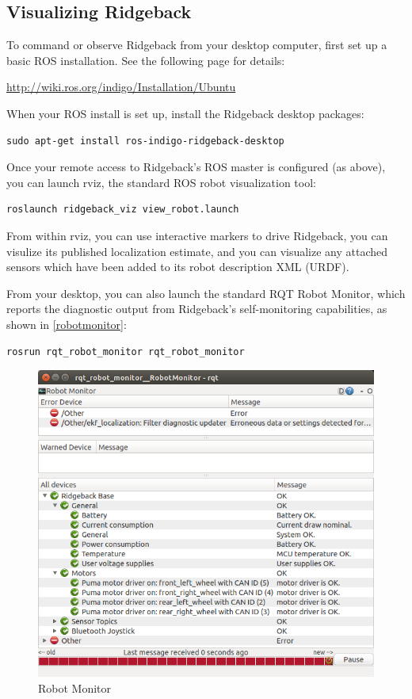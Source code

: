 \documentclass[]{clearpath-latex/clearpath-manual}
\begin{document}
\subsection{Visualizing Ridgeback}

To command or observe Ridgeback from your desktop computer, first set up a basic ROS installation.  See the following page for details:

\url{http://wiki.ros.org/indigo/Installation/Ubuntu}

When your ROS install is set up, install the Ridgeback desktop packages:

\begin{lstlisting}
sudo apt-get install ros-indigo-ridgeback-desktop
\end{lstlisting}

Once your remote access to Ridgeback's ROS master is configured (as above), you can launch rviz, the standard ROS robot visualization tool:

\begin{lstlisting}
roslaunch ridgeback_viz view_robot.launch
\end{lstlisting}

From within rviz, you can use interactive markers to drive Ridgeback, you can visulize its published localization estimate, and you can visualize any attached sensors which have been added to its robot description XML (URDF).

\pagebreak[4]

From your desktop, you can also launch the standard RQT Robot Monitor, which reports the diagnostic output from Ridgeback's self-monitoring capabilities, as shown in \autoref{robotmonitor}:

\begin{lstlisting}
rosrun rqt_robot_monitor rqt_robot_monitor
\end{lstlisting}

\begin{figure}[!htb]
  \centering
  \includegraphics[width=0.75\linewidth]{rqt_robot_monitor.png}
  \caption{Robot Monitor}
  \label{robotmonitor}
\end{figure}
\end{document}

